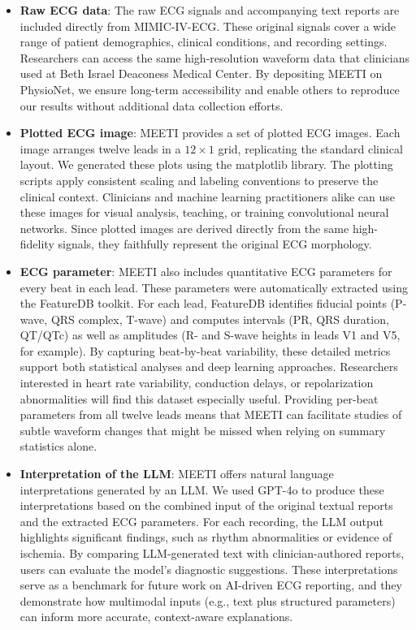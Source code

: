 \documentclass[12pt,letterpaper]{article}
\begin{document}
\begin{itemize}
\item \textbf{Raw ECG data}: The raw ECG signals and accompanying text reports are included directly from MIMIC-IV-ECG. These original signals cover a wide range of patient demographics, clinical conditions, and recording settings. Researchers can access the same high-resolution waveform data that clinicians used at Beth Israel Deaconess Medical Center. By depositing MEETI on PhysioNet, we ensure long-term accessibility and enable others to reproduce our results without additional data collection efforts.

\item \textbf{Plotted ECG image}: MEETI provides a set of plotted ECG images. Each image arranges twelve leads in a $12\times1$ grid, replicating the standard clinical layout. We generated these plots using the matplotlib library. The plotting scripts apply consistent scaling and labeling conventions to preserve the clinical context. Clinicians and machine learning practitioners alike can use these images for visual analysis, teaching, or training convolutional neural networks. Since plotted images are derived directly from the same high-fidelity signals, they faithfully represent the original ECG morphology.

\item \textbf{ECG parameter}: MEETI also includes quantitative ECG parameters for every beat in each lead. These parameters were automatically extracted using the FeatureDB toolkit. For each lead, FeatureDB identifies fiducial points (P-wave, QRS complex, T-wave) and computes intervals (PR, QRS duration, QT/QTc) as well as amplitudes (R- and S-wave heights in leads V1 and V5, for example). By capturing beat-by-beat variability, these detailed metrics support both statistical analyses and deep learning approaches. Researchers interested in heart rate variability, conduction delays, or repolarization abnormalities will find this dataset especially useful. Providing per-beat parameters from all twelve leads means that MEETI can facilitate studies of subtle waveform changes that might be missed when relying on summary statistics alone.

\item \textbf{Interpretation of the LLM}: MEETI offers natural language interpretations generated by an LLM. We used GPT-4o \cite{achiam2023gpt} to produce these interpretations based on the combined input of the original textual reports and the extracted ECG parameters. For each recording, the LLM output highlights significant findings, such as rhythm abnormalities or evidence of ischemia. By comparing LLM-generated text with clinician-authored reports, users can evaluate the model’s diagnostic suggestions. These interpretations serve as a benchmark for future work on AI-driven ECG reporting, and they demonstrate how multimodal inputs (e.g., text plus structured parameters) can inform more accurate, context-aware explanations.
\end{itemize}
\end{document}
